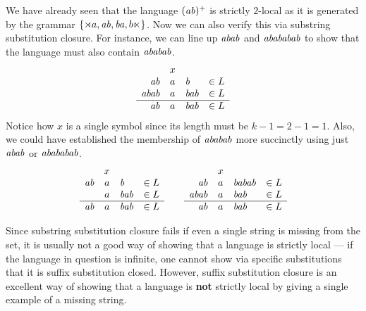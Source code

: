 \begin{examplebox}
    We have already seen that the language $(\mathit{ab})^+$ is strictly $2$-local as it is generated by the grammar $\left \{ \rtimes a, \mathit{ab}, \mathit{ba}, b \ltimes \right \}$.
    Now we can also verify this via substring substitution closure.
    For instance, we can line up $\mathit{abab}$ and $\mathit{abababab}$ to show that the language must also contain $\mathit{ababab}$.
    \[
        \begin{array}{rcll}
                          & x &              & \\
            \mathit{ab}   & a & \mathit{b}   & \in L\\
            \mathit{abab} & a & \mathit{bab} & \in L\\\hline
            \mathit{ab}   & a & \mathit{bab} & \in L
        \end{array}
    \]
    Notice how $x$ is a single symbol since its length must be $k-1 = 2 - 1 = 1$.
    Also, we could have established the membership of $\mathit{ababab}$ more succinctly using just $\mathit{abab}$ or $\mathit{abababab}$.
    \[
        \begin{array}{rcll}
                        & x &              & \\
            \mathit{ab} & a & \mathit{b}   & \in L\\
                        & a & \mathit{bab} & \in L\\\hline
            \mathit{ab} & a & \mathit{bab} & \in L
        \end{array}
        \qquad
        \begin{array}{rcll}
                          & x &                & \\
            \mathit{ab}   & a & \mathit{babab} & \in L\\
            \mathit{abab} & a & \mathit{bab}   & \in L\\\hline
            \mathit{ab}   & a & \mathit{bab}   & \in L
        \end{array}
    \]
\end{examplebox}
%
Since substring substitution closure fails if even a single string is missing from the set, it is usually not a good way of showing that a language is strictly local --- if the language in question is infinite, one cannot show via specific substitutions that it is suffix substitution closed.
However, suffix substitution closure is an excellent way of showing that a language is \textbf{not} strictly local by giving a single example of a missing string.

